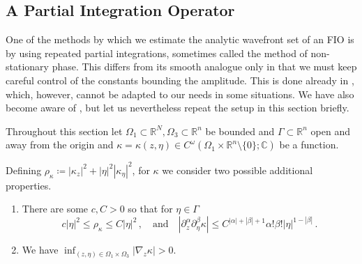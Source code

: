 \documentclass[
	fontsize=11pt, 
	twoside=false, 
	abstract=true, 
	a4paper,
]{scrartcl}
\newcommand{\sem}{\setminus\{0\}}
\newcommand{\RR}{\mathbb{R}}
\newcommand{\abs}[1]{\left\lvert#1\right\rvert}
\newcommand{\del}{\partial}
\newcommand{\an}{\quad\text{and}\quad}
\begin{document}
\subsection{A Partial Integration Operator}\label{sec:pio}

One of the methods by which we estimate the analytic wavefront set of an FIO is by using repeated partial integrations, sometimes called the method of non-stationary phase. This differs from its smooth analogue only in that we must keep careful control of the constants bounding the amplitude. This is done already in \cite[Thm.~7.7.1]{hoermander1}, which, however, cannot be adapted to our needs in some situations. We have also become aware of \cite[\S~1.5]{zbMATH04105482}, but let us nevertheless repeat the setup in this section briefly. 

Throughout this section let $\Omega_1\subset \RR^N, \Omega_3 \subset \RR^n$ be bounded and $\Gamma \subset \RR^n$ open and away from the origin and $\kappa = \kappa(z,\eta) \in C^\omega(\Omega_1 \times \RR^n\sem;\mathbb{C})$ be a function.

Defining $\rho_\kappa \coloneqq \abs{\kappa_z}^2 + \abs{\eta}^2\abs{\kappa_\eta}^2$, for $\kappa$ we consider two possible additional properties.
\begin{enumerate}[label=$\kappa$\arabic*.]
	\item\label{as:kappa1} 
		There are some $c,C > 0$ so that for $\eta\in\Gamma$ 
		\begin{equation}\label{eq:kappa1}
	c\abs{\eta}^2 \leq \rho_\kappa \leq C\abs{\eta}^2\,,\an\abs{\del^\alpha_z \del^\beta_\eta \kappa} \leq C^{\abs{\alpha}+\abs{\beta}+1} \alpha!\beta! \abs{\eta}^{1-\abs{\beta}}\,.
	\end{equation}
\item\label{as:kappa2} We have $\inf_{(z,\eta)\in \Omega_1\times\Omega_3}\abs{\nabla_z \kappa} > 0$.
\end{enumerate}
\end{document}
